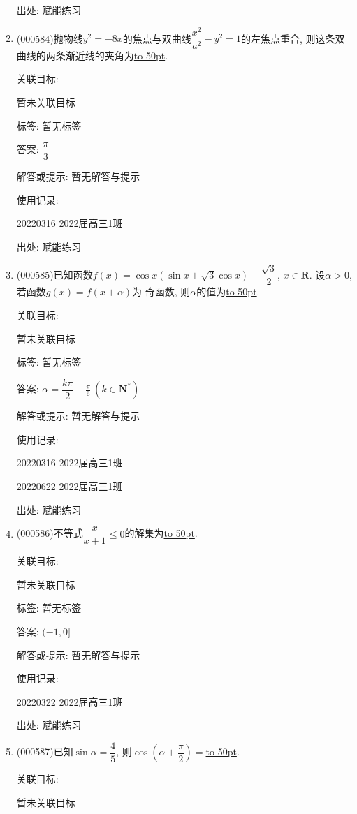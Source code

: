 \documentclass[10pt,a4paper]{article}
\newcommand{\blank}[1]{\underline{\hbox to #1pt{}}}
\begin{document}
\begin{enumerate}[1.]
出处: 赋能练习
\item { (000584)}抛物线$y^2=-8x$的焦点与双曲线$\dfrac{x^2}{a^2}-y^2=1$的左焦点重合, 则这条双曲线的两条渐近线的夹角为\blank{50}.


关联目标:

暂未关联目标



标签: 暂无标签

答案: $\dfrac{\pi }3$

解答或提示: 暂无解答与提示

使用记录:

20220316	2022届高三1班	


出处: 赋能练习
\item { (000585)}已知函数$f(x)=\cos x(\sin x+\sqrt3\cos x)-\dfrac{\sqrt3}2$, $x\in \mathbf{R}$. 设$\alpha>0$, 若函数$g(x)=f(x+\alpha)$为 奇函数, 则$\alpha$的值为\blank{50}.


关联目标:

暂未关联目标



标签: 暂无标签

答案: $\alpha =\dfrac{k\pi }2-\frac{\pi }6 \ (k\in \mathbf{N}^*)$

解答或提示: 暂无解答与提示

使用记录:

20220316	2022届高三1班	

20220622	2022届高三1班  	


出处: 赋能练习
\item { (000586)}不等式$\dfrac x{x+1}\le 0$的解集为\blank{50}.


关联目标:

暂未关联目标



标签: 暂无标签

答案: $(-1,0]$

解答或提示: 暂无解答与提示

使用记录:

20220322	2022届高三1班	


出处: 赋能练习
\item { (000587)}已知$\sin\alpha=\dfrac45$, 则$\cos(\alpha+\dfrac{\pi}2)=$\blank{50}.


关联目标:

暂未关联目标




\end{enumerate}
\end{document}
